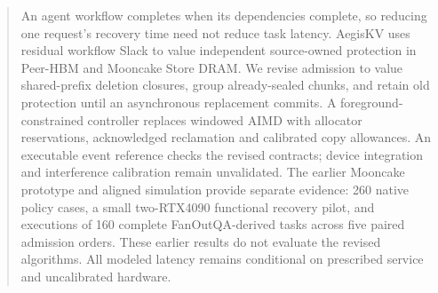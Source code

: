 \begin{abstract}
An agent workflow completes when its dependencies complete, so reducing one
request's recovery time need not reduce task latency. AegisKV uses residual
workflow Slack to value independent source-owned protection in Peer-HBM and
Mooncake Store DRAM. We revise admission to value shared-prefix deletion
closures, group already-sealed chunks, and retain old protection until an
asynchronous replacement commits. A foreground-constrained controller
replaces windowed AIMD with allocator reservations, acknowledged reclamation
and calibrated copy allowances. An executable event reference checks the
revised contracts; device integration and interference calibration remain
unvalidated. The earlier Mooncake prototype and aligned simulation provide
separate evidence: 260 native policy cases, a small two-RTX4090 functional
recovery pilot, and \MeasuredRuns{} executions of 160 complete FanOutQA-derived
tasks across five paired admission orders. \AbstractResults{}
These earlier results do not evaluate the revised algorithms. All modeled
latency remains conditional on prescribed service and uncalibrated hardware.
\end{abstract}
